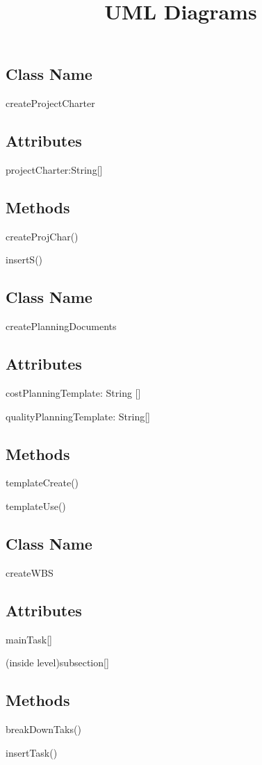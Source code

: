 \documentclass[10pt]{article}
\begin{document}
\newpage
\title{UML Diagrams}
\hline
\subsection{Class Name}
    \item createProjectCharter
\subsection{Attributes}
    \item projectCharter:String[]
\subsection{Methods}
    \item createProjChar()
        \item insertS()\\

\subsection{Class Name}
    \item createPlanningDocuments
\subsection{ Attributes}
    \item costPlanningTemplate: String []
    \item qualityPlanningTemplate: String[]
\subsection{Methods}
    \item templateCreate()
    \item templateUse()\\

\subsection{Class Name}
    \item createWBS
\subsection{Attributes}
    \item mainTask[]
    \item (inside level)subsection[]
\subsection{Methods}
    \item breakDownTaks()
    \item insertTask()
\end{document}
